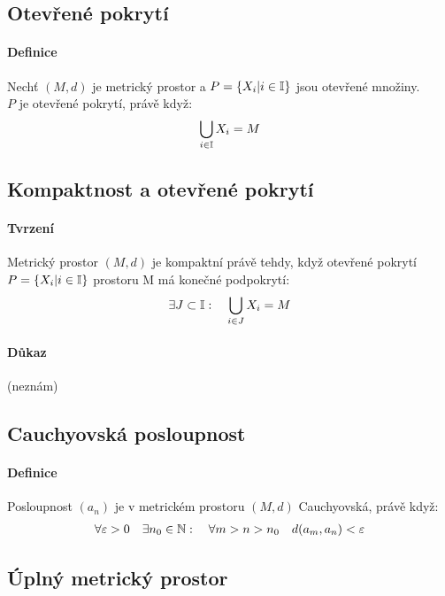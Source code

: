 \documentclass[a4paper,10pt]{article}
\begin{document}
\subsection{Otevřené pokrytí}
\setcounter{equation}{0}
\paragraph{Definice}
Nechť $(M, d)$ je metrický prostor a $P = \{X_i | i \in \mathbb{I}\}$ jsou otevřené
množiny. \\ $P$ je otevřené pokrytí, právě když:
\begin{align}
	\bigcup_{i \in \mathbb{I}} X_i = M
\end{align}

\subsection{Kompaktnost a otevřené pokrytí}
\setcounter{equation}{0}
\paragraph{Tvrzení}
Metrický prostor $(M,d)$ je kompaktní právě tehdy, když otevřené
pokrytí $P = \{X_i | i \in \mathbb{I}\}$ prostoru M má konečné podpokrytí:
\begin{align*}
	\exists J \subset \mathbb{I}: \quad \bigcup_{i \in J} X_i = M
\end{align*}
\paragraph{Důkaz}
(neznám)



\subsection{Cauchyovská posloupnost}
\setcounter{equation}{0}
\paragraph{Definice}
Posloupnost $(a_n)$ je v metrickém prostoru $(M, d)$ Cauchyovská, právě když:
\begin{align*}
	\forall \varepsilon > 0 \quad \exists n_0 \in \mathbb{N}: \quad \forall m > n > n_0
	\quad d(a_m, a_n) < \varepsilon
\end{align*}


\subsection{Úplný metrický prostor}
\setcounter{equation}{0}
\end{document}
